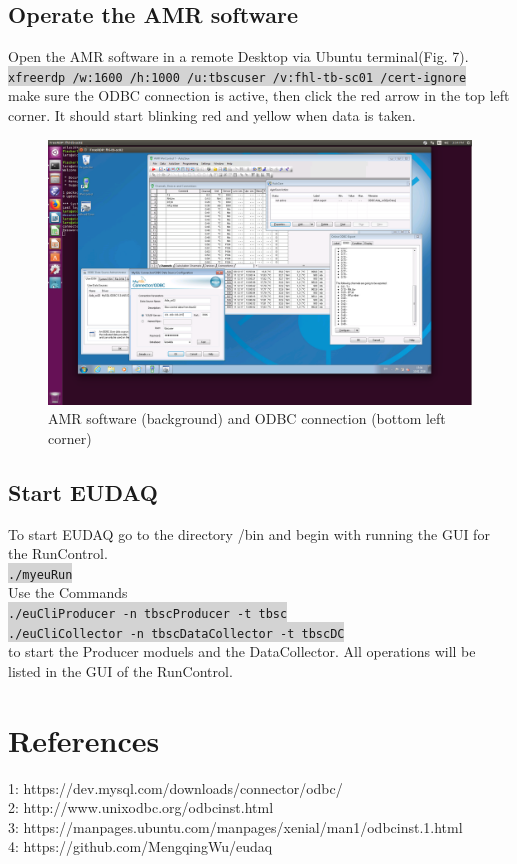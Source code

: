 \documentclass[a4paper,12pt]{scrartcl}
\begin{document}
\subsection{Operate the AMR software}
Open the AMR software in a remote Desktop via Ubuntu terminal(Fig. 7). \\
\colorbox{lightgray}{\texttt{xfreerdp /w:1600 /h:1000 /u:tbscuser /v:fhl-tb-sc01 /cert-ignore}} \\
make sure the ODBC connection is active, then click the red arrow in the top left corner. It should start blinking red and yellow when data is taken.

\begin{figure} [H]
\centering
\includegraphics[trim={5cm 5cm 7cm 2cm},clip,width=\textwidth]{AMRSoftware.png}
\caption{AMR software (background) and ODBC connection (bottom left corner)}
\end{figure}

\subsection{Start EUDAQ}
To start EUDAQ go to the directory /bin and begin with running the GUI for the RunControl.\\
\colorbox{lightgray}{\texttt{./myeuRun}} \\
Use the Commands \\
\colorbox{lightgray}{\texttt{./euCliProducer -n tbscProducer -t tbsc}} \\
\colorbox{lightgray}{\texttt{./euCliCollector -n tbscDataCollector -t tbscDC}} \\
to start the Producer moduels and the DataCollector. All operations will be listed in the GUI of the RunControl.


\pagebreak
\section{References}
1: https://dev.mysql.com/downloads/connector/odbc/ \\
2: http://www.unixodbc.org/odbcinst.html \\
3: https://manpages.ubuntu.com/manpages/xenial/man1/odbcinst.1.html \\
4: https://github.com/MengqingWu/eudaq \\
\end{document}
